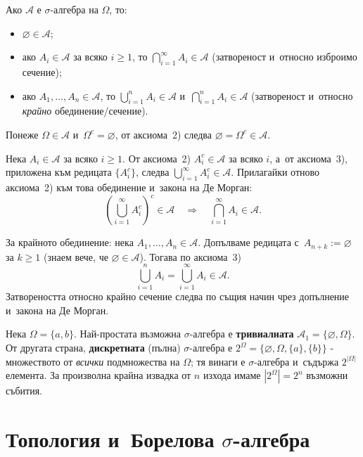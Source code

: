 \begin{corbox}
Ако $\mathcal{A}$ е $\sigma$-алгебра на $\Omega$, то:
\begin{itemize}[nosep]
  \item $\varnothing \in \mathcal{A}$;
  \item ако $A_i \in \mathcal{A}$ за всяко $i \geq 1$, то $\bigcap_{i=1}^{\infty} A_i \in \mathcal{A}$ (затвореност и~относно изброимо сечение);
  \item ако $A_1,\dots,A_n \in \mathcal{A}$, то $\bigcup_{i=1}^{n} A_i \in \mathcal{A}$ и~$\bigcap_{i=1}^n A_i \in \mathcal A$ (затвореност и~относно \emph{крайно} обединение/сечение).
\end{itemize}
\end{corbox}

\begin{proofbox}
Понеже $\Omega \in \mathcal{A}$ и~$\Omega^c = \varnothing$, от аксиома~2)
следва $\varnothing = \Omega^c \in \mathcal{A}$.

Нека $A_i \in \mathcal{A}$ за всяко $i \geq 1$. От аксиома~2) $A_i^c \in
\mathcal{A}$ за всяко $i$, а~от аксиома~3), приложена към редицата
$\{A_i^c\}$, следва $\bigcup_{i=1}^{\infty} A_i^c \in \mathcal{A}$.
Прилагайки отново аксиома~2) към това обединение и~закона на Де
Морган:
\[
  \left(\bigcup_{i=1}^{\infty} A_i^c\right)^{c} \in \mathcal{A}
  \quad\Longrightarrow\quad
  \bigcap_{i=1}^{\infty} A_i \in \mathcal{A}.
\]

За крайното обединение: нека $A_1,\dots,A_n \in \mathcal{A}$. Допълваме
редицата с~$A_{n+k} := \varnothing$ за $k \geq 1$ (знаем вече, че
$\varnothing \in \mathcal{A}$). Тогава по аксиома~3)
\[
  \bigcup_{i=1}^{n} A_i = \bigcup_{i=1}^{\infty} A_i \in \mathcal{A}.
\]
Затвореността относно крайно сечение следва по същия начин чрез
допълнение и~закона на Де Морган. \qedbg
\end{proofbox}

\begin{rembox}[Примери]
Нека $\Omega = \{a,b\}$. Най-простата възможна $\sigma$-алгебра е
\textbf{тривиалната} $\mathcal{A}_1 = \{\varnothing,\Omega\}$. От
другата страна, \textbf{дискретната} (пълна) $\sigma$-алгебра е
$2^{\Omega} = \{\varnothing,\Omega,\{a\},\{b\}\}$ - множеството от
\emph{всички} подмножества на $\Omega$; тя винаги е $\sigma$-алгебра
и~съдържа $2^{|\Omega|}$ елемента. За произволна крайна извадка от $n$
изхода имаме $|2^\Omega| = 2^n$ възможни събития.
\end{rembox}

\section{Топология и~Борелова \texorpdfstring{$\sigma$}{sigma}-алгебра}

